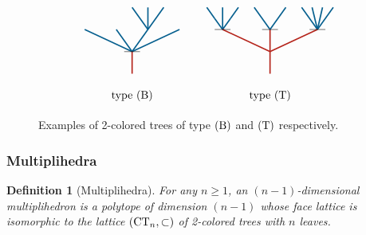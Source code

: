 \documentclass[twoside, 11pt]{amsart}
\newtheorem{definition}{Definition}[section]
\theoremstyle{remark}
\begin{document}
\begin{figure}[h]
\[\vcenter{\hbox{
\begin{tikzpicture}[yscale=0.7,xscale=1]
\draw[very thick, MidnightBlue] (0.5,1)--(0,2);
\draw[very thick, MidnightBlue] (0.5,1)--(0.5,2);
\draw[very thick, MidnightBlue] (0.5,1)--(1,2);
\draw[very thick, MidnightBlue] (0,0)--(0.5, 1); 
\draw[very thick, MidnightBlue] (0,0)--(-0.5, 1); 
\draw[very thick, MidnightBlue] (0,0)--(-1.5,1);
\draw[very thick, MidnightBlue] (0,0)--(1.5, 1);
\draw[very thick, BrickRed] (0,-1)--(0, 0); 
\draw (-0.25,0) to (0.25,0); 
\draw (0,-2) node {type $(\B)$};
\end{tikzpicture}}}\qquad \vcenter{\hbox{
\begin{tikzpicture}[yscale=0.7,xscale=1]
\draw[very thick, MidnightBlue] (-1.5,1)--(-1.5,2);
\draw[very thick, MidnightBlue] (-2,2) -- (-1.75,1.5);
\draw[very thick, MidnightBlue] (-1.25, 1.5) -- (-1,2);
\draw[very thick, MidnightBlue] (-0.5,2) -- (0,1);
\draw[very thick, MidnightBlue] (0,1)--(0.5,2);
\draw[very thick, MidnightBlue] (1.5,1)--(1,2);
\draw[very thick, MidnightBlue] (1.5,1)--(1.33,2);
\draw[very thick, MidnightBlue] (1.5,1)--(1.66,2);
\draw[very thick, MidnightBlue] (1.5,1)--(2,2);
\draw[very thick, MidnightBlue] (-1.5,1)--(-1.75, 1.5); 
\draw[very thick, MidnightBlue] (-1.5,1)--(-1.25, 1.5); 
\draw[very thick, BrickRed] (0,-1)--(0, 1); 
\draw[very thick, BrickRed] (0,0)--(-1.5,1);
\draw[very thick, BrickRed] (0,0)--(1.5, 1);
\draw (-1.75,1) to (-1.25,1); 
\draw (-0.25,1) to (0.25,1); 
\draw (1.25,1) to (1.75,1);
\draw (0,-2) node {type $(\T)$};
\end{tikzpicture}}}\]
\caption{Examples of 2-colored trees of type $(\mathrm{B})$ and $(\mathrm{T})$ respectively. }
\label{Fig5:FacetsColoredTrees}
\end{figure}


\subsubsection{Multiplihedra} \label{sec:multiplihedra}

\begin{definition}[Multiplihedra]
For any $n\geq 1$, an \emph{$(n-1)$-dimensional multiplihedron} is a polytope of dimension $(n-1)$ whose face lattice is isomorphic to the lattice 
$(\mathrm{CT}_{n}, \subset)$
of 2-colored trees with $n$ leaves. 
\end{definition}
\end{document}
